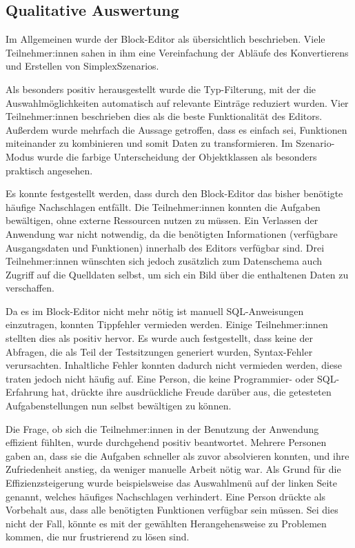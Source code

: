 \subsection{Qualitative Auswertung}
\label{sec:qualitative}

Im Allgemeinen wurde der Block-Editor als übersichtlich beschrieben. Viele Teilnehmer:innen sahen in ihm eine Vereinfachung der Abläufe des Konvertierens und Erstellen von SimplexSzenarios.

Als besonders positiv herausgestellt wurde die Typ-Filterung, mit der die Auswahlmöglichkeiten automatisch auf relevante Einträge reduziert wurden. Vier Teilnehmer:innen beschrieben dies als die beste Funktionalität des Editors. Außerdem wurde mehrfach die Aussage getroffen, dass es einfach sei, Funktionen miteinander zu kombinieren und somit Daten zu transformieren. Im Szenario-Modus wurde die farbige Unterscheidung der Objektklassen als besonders praktisch angesehen.

Es konnte festgestellt werden, dass durch den Block-Editor das bisher benötigte häufige Nachschlagen entfällt. Die Teilnehmer:innen konnten die Aufgaben bewältigen, ohne externe Ressourcen nutzen zu müssen. Ein Verlassen der Anwendung war nicht notwendig, da die benötigten Informationen (verfügbare Ausgangsdaten und Funktionen) innerhalb des Editors verfügbar sind. Drei Teilnehmer:innen wünschten sich jedoch zusätzlich zum Datenschema auch Zugriff auf die Quelldaten selbst, um sich ein Bild über die enthaltenen Daten zu verschaffen.

Da es im Block-Editor nicht mehr nötig ist manuell \ac{SQL}-Anweisungen einzutragen, konnten Tippfehler vermieden werden. Einige Teilnehmer:innen stellten dies als positiv hervor. Es wurde auch festgestellt, dass keine der Abfragen, die als Teil der Testsitzungen generiert wurden, Syntax-Fehler verursachten. Inhaltliche Fehler konnten dadurch nicht vermieden werden, diese traten jedoch nicht häufig auf. Eine Person, die keine Programmier- oder \ac{SQL}-Erfahrung hat, drückte ihre ausdrückliche Freude darüber aus, die getesteten Aufgabenstellungen nun selbst bewältigen zu können.

Die Frage, ob sich die Teilnehmer:innen in der Benutzung der Anwendung effizient fühlten, wurde durchgehend positiv beantwortet. Mehrere Personen gaben an, dass sie die Aufgaben schneller als zuvor absolvieren konnten, und ihre Zufriedenheit anstieg, da weniger manuelle Arbeit nötig war. Als Grund für die Effizienzsteigerung wurde beispielsweise das Auswahlmenü auf der linken Seite genannt, welches häufiges Nachschlagen verhindert. Eine Person drückte als Vorbehalt aus, dass alle benötigten Funktionen verfügbar sein müssen. Sei dies nicht der Fall, könnte es mit der gewählten Herangehensweise zu Problemen kommen, die nur frustrierend zu lösen sind.


